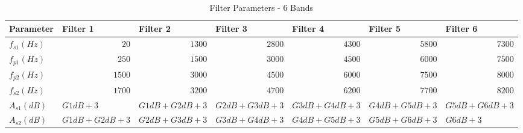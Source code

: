\documentclass[11pt,onecolumn]{witseiepaper}
\begin{document}
\begin{appendices}
\begin{table}[htbp]
  \centering
  \caption{Filter Parameters - 6 Bands}
  \begin{adjustbox}{width=0.9\linewidth}
    \begin{tabular}{|l|l|l|l|l|l|l|}
    \hline
    \textbf{Parameter} & \textbf{Filter 1} & \textbf{Filter 2} & \textbf{Filter 3} & \textbf{Filter 4} & \textbf{Filter 5} & \textbf{Filter 6} \\
    \hline
    $f_{s1} (Hz)$   & \multicolumn{1}{r|}{$20$} & \multicolumn{1}{r|}{$1300$} & \multicolumn{1}{r|}{$2800$} & \multicolumn{1}{r|}{$4300$} & \multicolumn{1}{r|}{$5800$} & \multicolumn{1}{r|}{$7300$} \\
    \hline
    $f_{p1} (Hz)$   & \multicolumn{1}{r|}{$250$} & \multicolumn{1}{r|}{$1500$} & \multicolumn{1}{r|}{$3000$} & \multicolumn{1}{r|}{$4500$} & \multicolumn{1}{r|}{$6000$} & \multicolumn{1}{r|}{$7500$} \\
    \hline
    $f_{p2} (Hz)$   & \multicolumn{1}{r|}{$1500$} & \multicolumn{1}{r|}{$3000$} & \multicolumn{1}{r|}{$4500$} & \multicolumn{1}{r|}{$6000$} & \multicolumn{1}{r|}{$7500$} & \multicolumn{1}{r|}{$8000$} \\
    \hline
    $f_{s2} (Hz)$   & \multicolumn{1}{r|}{$1700$} & \multicolumn{1}{r|}{$3200$} & \multicolumn{1}{r|}{$4700$} & \multicolumn{1}{r|}{$6200$} & \multicolumn{1}{r|}{$7700$} & \multicolumn{1}{r|}{$8200$} \\
    \hline
    $A_{s1} (dB)$   & $G1dB + 3$ & $G1dB + G2dB + 3 $& $G2dB + G3dB + 3 $&$ G3dB + G4dB + 3$ &$ G4dB + G5dB + 3$ &$ G5dB + G6dB + 3$ \\
    \hline
    $A_{s2} (dB)$   &$ G1dB + G2dB + 3$ &$ G2dB + G3dB + 3$ & $G3dB + G4dB + 3$ & $G4dB + G5dB + 3$ & $G5dB + G6dB + 3 $& $G6dB + 3$ \\
    \hline
    \end{tabular}%
    \end{adjustbox}
  \label{tab:filtPara6Band}%
\end{table}%



\end{appendices}
\end{document}
